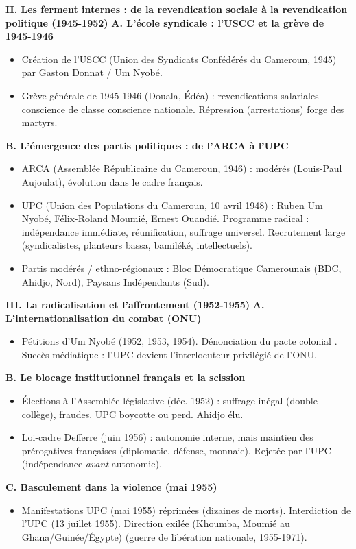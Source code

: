 \documentclass[11pt]{article}
\newcommand{\cle}[1]{{\popxbold\color{popdark}#1}}
\begin{document}
\begin{exoresolu}
\textbf{II. Les ferment internes : de la revendication sociale à la revendication politique (1945-1952)}
\textbf{A. L'école syndicale : l'USCC et la grève de 1945-1946}
\begin{itemize}
    \item Création de l'\cle{USCC} (Union des Syndicats Confédérés du Cameroun, 1945) par Gaston Donnat / Um Nyobé.
    \item Grève générale de 1945-1946 (Douala, Édéa) : revendications salariales \rightarrow conscience de classe \rightarrow conscience nationale. Répression (arrestations) forge des martyrs.
\end{itemize}
\textbf{B. L'émergence des partis politiques : de l'ARCA à l'UPC}
\begin{itemize}
    \item \cle{ARCA} (Assemblée Républicaine du Cameroun, 1946) : modérés (Louis-Paul Aujoulat), évolution dans le cadre français.
    \item \cle{UPC} (Union des Populations du Cameroun, 10 avril 1948) : \cle{Ruben Um Nyobé}, \cle{Félix-Roland Moumié}, \cle{Ernest Ouandié}. Programme radical : indépendance immédiate, réunification, suffrage universel. Recrutement large (syndicalistes, planteurs bassa, bamiléké, intellectuels).
    \item \cle{Partis modérés / ethno-régionaux} : Bloc Démocratique Camerounais (BDC, Ahidjo, Nord), Paysans Indépendants (Sud).
\end{itemize}

\textbf{III. La radicalisation et l'affrontement (1952-1955)}
\textbf{A. L'internationalisation du combat (ONU)}
\begin{itemize}
    \item Pétitions d'Um Nyobé (1952, 1953, 1954). Dénonciation du \guillemotleft pacte colonial \guillemotright. Succès médiatique : l'UPC devient l'interlocuteur privilégié de l'ONU.
\end{itemize}
\textbf{B. Le blocage institutionnel français et la scission}
\begin{itemize}
    \item Élections à l'Assemblée législative (déc. 1952) : suffrage inégal (double collège), fraudes. UPC boycotte ou perd. Ahidjo élu.
    \item \cle{Loi-cadre Defferre (juin 1956)} : autonomie interne, mais maintien des prérogatives françaises (diplomatie, défense, monnaie). Rejetée par l'UPC (indépendance \emph{avant} autonomie).
\end{itemize}
\textbf{C. Basculement dans la violence (mai 1955)}
\begin{itemize}
    \item Manifestations UPC (mai 1955) réprimées (dizaines de morts). Interdiction de l'UPC (13 juillet 1955). Direction exilée (Khoumba, Moumié au Ghana/Guinée/Égypte) \rightarrow \cle{Maquis} (guerre de libération nationale, 1955-1971).
\end{itemize}


\end{exoresolu}
\end{document}
